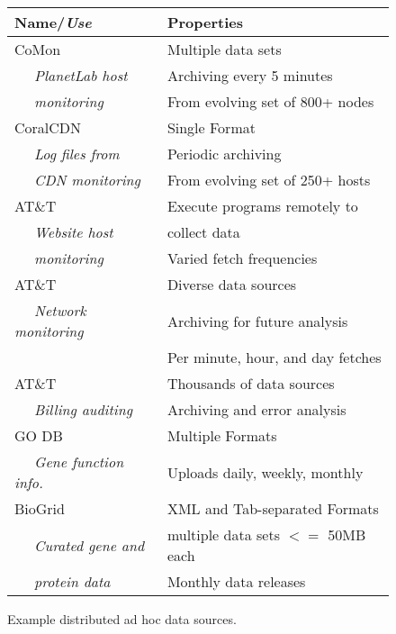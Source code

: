 \begin{figure}
\begin{center}
\begin{tabular}{|l|l|}
\hline
{\bf Name/{\em Use}} & {\bf Properties} 
\\\hline\hline
CoMon~\cite{comon} & Multiple data sets \\
{\em ~~ PlanetLab host}              & Archiving every 5 minutes \\
{\em ~~ monitoring}                              & From evolving set of 800+ nodes \\\hline
CoralCDN~\cite{coral}         & Single Format \\
{\em ~~ Log files from}  & Periodic archiving \\
{\em ~~ CDN monitoring}                  & From evolving set of 250+ hosts \\\hline
AT\&T \vizGems{}                    & Execute programs remotely to \\
{\em ~~ Website host}                 & collect data \\
{\em ~~  monitoring}                   & Varied fetch frequencies \\\hline
AT\&T \darkstar{}                   & Diverse data sources\\
{\em ~~ Network monitoring}       & Archiving for future analysis \\
				& Per minute, hour, and day fetches\\\hline
AT\&T \ningaui{}                    & Thousands of data sources\\
{\em ~~ Billing auditing}        & Archiving and error analysis\\\hline
GO DB~\cite{geneontology} & Multiple Formats \\
{\em ~~ Gene function info.}     & Uploads daily, weekly, monthly \\\hline
BioGrid~\cite{biogrid}        & XML and Tab-separated Formats \\
{\em ~~ Curated gene and}  & multiple data sets $<=$ 50MB each \\
{\em ~~ protein data}                              & Monthly data releases \\\hline
\end{tabular}
\end{center}
\caption{Example distributed ad hoc data sources.}
\label{fig:exampledata}
\end{figure}

